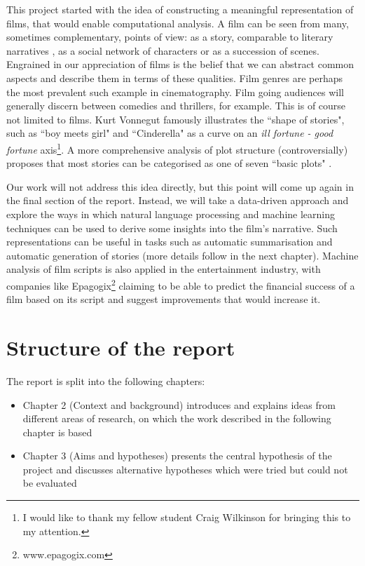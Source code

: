 \documentclass[bsc,frontabs,singlespacing,parskip, twoside]{infthesis}
\begin{document}
This project started with the idea of constructing a meaningful representation of films, that would enable computational analysis. A film can be seen from many, sometimes complementary, points of view: as a story, comparable to literary narratives \cite{jinks1971celluloid}, as a social network of characters or as a succession of scenes. Engrained in our appreciation of films is the belief that we can abstract common aspects and describe them in terms of these qualities. Film genres are perhaps the most prevalent such example in cinematography. Film going audiences will generally discern between comedies and thrillers, for example. This is of course not limited to films. Kurt Vonnegut \cite{vonnegut2011man} famously illustrates the ``shape of stories", such as ``boy meets girl" and ``Cinderella" as a curve on an \textit{ill fortune - good fortune} axis\footnote{I would like to thank my fellow student Craig Wilkinson for bringing this to my attention.}. A more comprehensive analysis of plot structure (controversially) proposes that most stories can be categorised as one of seven ``basic plots" \cite{booker2004seven}.

Our work will not address this idea directly, but this point will come up again in the final section of the report. Instead, we will take a data-driven approach and explore the ways in which natural language processing and machine learning techniques can be used to derive some insights into the film's narrative. Such representations can be useful in tasks such as automatic summarisation and automatic generation of stories (more details follow in the next chapter). Machine analysis of film scripts is also applied in the entertainment industry, with companies like Epagogix\footnote{www.epagogix.com} claiming to be able to predict the financial success of a film based on its script and suggest improvements that would increase it.

\section{Structure of the report}
The report is split into the following chapters:
\begin{itemize}
	\item Chapter 2 (Context and background) introduces and explains ideas from different areas of research, on which the work described in the following chapter is based
	\item Chapter 3 (Aims and hypotheses) presents the central hypothesis of the project and discusses alternative hypotheses which were tried but could not be evaluated
\end{itemize}
\end{document}
